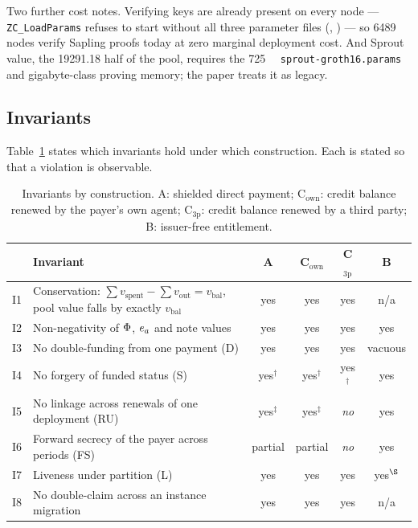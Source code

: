 Two further cost notes. Verifying keys are already present on every node --- \texttt{ZC\_LoadParams}
refuses to start without all three parameter files (\shipped,
) --- so \num{6489} nodes verify Sapling proofs today at zero
marginal deployment cost. And Sprout value, the \num{19291.18}\flux{} half of the pool, requires the
\qty{725}{\mega\byte} \texttt{sprout-groth16.\allowbreak{}params} and gigabyte-class proving memory; the paper
treats it as legacy.

\subsection{Invariants}
\label{sec:pp-invariants}

Table~\ref{tab:pp-invariants} states which invariants hold under which construction. Each is stated so
that a violation is observable.

\begin{table}[H]
\centering
\small
\caption{Invariants by construction. A: shielded direct payment; C$_{\mathrm{own}}$: credit balance
renewed by the payer's own agent; C$_{3\mathrm{p}}$: credit balance renewed by a third party;
B: issuer-free entitlement.}
\label{tab:pp-invariants}
\begin{tabular}{@{}llcccc@{}}
\toprule
& \textbf{Invariant} & \textbf{A} & \textbf{C}$_{\mathrm{own}}$ & \textbf{C}$_{3\mathrm{p}}$ & \textbf{B} \\
\midrule
I1 & Conservation: $\sum v_{\mathrm{spent}} - \sum v_{\mathrm{out}} = v_{\mathrm{bal}}$, pool value falls by exactly $v_{\mathrm{bal}}$ & yes & yes & yes & n/a \\
I2 & Non-negativity of $\Phi$, $e_{a}$ and note values & yes & yes & yes & yes \\
I3 & No double-funding from one payment (D) & yes & yes & yes & vacuous \\
I4 & No forgery of funded status (S) & yes$^\dagger$ & yes$^\dagger$ & yes$^\dagger$ & yes \\
I5 & No linkage across renewals of one deployment (RU) & yes$^\ddagger$ & yes$^\ddagger$ & \emph{no} & yes \\
I6 & Forward secrecy of the payer across periods (FS) & partial & partial & \emph{no} & yes \\
I7 & Liveness under partition (L) & yes & yes & yes & yes$^\S$ \\
I8 & No double-claim across an instance migration & yes & yes & yes & n/a \\
\bottomrule
\end{tabular}
\end{table}

